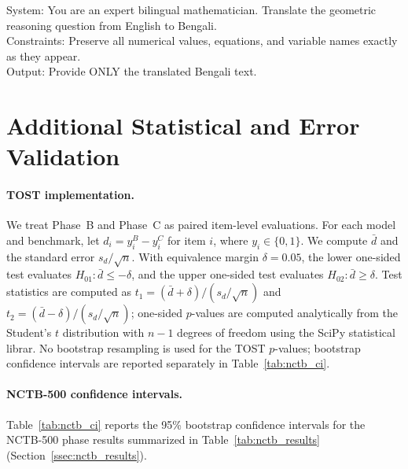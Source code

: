 \documentclass[11pt]{article}
\begin{document}
\begin{tcolorbox}[colback=gray!5, colframe=gray!50!black, title=Translation Prompt: English to Bengali, fonttitle=\bfseries]
\small
\ttfamily
System: You are an expert bilingual mathematician. Translate the geometric reasoning question from English to Bengali.\\[2pt]
Constraints: Preserve all numerical values, equations, and variable names exactly as they appear.\\[2pt]
Output: Provide ONLY the translated Bengali text.
\end{tcolorbox}

\section{Additional Statistical and Error Validation}
\label{app:stats}

\paragraph{TOST implementation.}
We treat Phase~B and Phase~C as paired item-level evaluations. For each model and benchmark, let $d_i = y_i^{B} - y_i^{C}$ for item $i$, where $y_i \in \{0,1\}$. We compute $\bar d$ and the standard error $s_d/\sqrt{n}$. With equivalence margin $\delta=0.05$, the lower one-sided test evaluates $H_{01}: \bar d \le -\delta$, and the upper one-sided test evaluates $H_{02}: \bar d \ge \delta$. Test statistics are computed as
$t_1 = (\bar d + \delta)/(s_d/\sqrt{n})$ and $t_2 = (\bar d - \delta)/(s_d/\sqrt{n})$; one-sided $p$-values are computed analytically from the Student's $t$ distribution with $n-1$ degrees of freedom using the SciPy statistical librar. No bootstrap resampling is used for the TOST $p$-values; bootstrap confidence intervals are reported separately in Table~\ref{tab:nctb_ci}.


\paragraph{NCTB-500 confidence intervals.} Table~\ref{tab:nctb_ci} reports the 95\% bootstrap confidence intervals for the NCTB-500 phase results summarized in Table~\ref{tab:nctb_results} (Section~\ref{ssec:nctb_results}).
\end{document}

